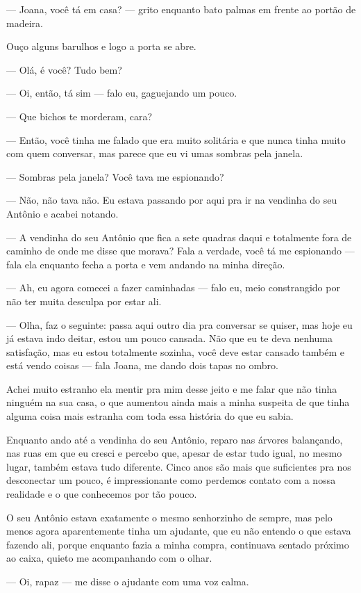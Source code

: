 — Joana, você tá em casa? — grito enquanto bato palmas em frente ao portão de madeira.

Ouço alguns barulhos e logo a porta se abre.

— Olá, é você? Tudo bem?

— Oi, então, tá sim — falo eu, gaguejando um pouco.

— Que bichos te morderam, cara?

— Então, você tinha me falado que era muito solitária e que nunca tinha muito com quem conversar, mas parece que eu vi umas sombras pela janela.

— Sombras pela janela? Você tava me espionando?

— Não, não tava não. Eu estava passando por aqui pra ir na vendinha do seu Antônio e acabei notando.

— A vendinha do seu Antônio que fica a sete quadras daqui e totalmente fora de caminho de onde me disse que morava? Fala a verdade, você tá me espionando — fala ela enquanto fecha a porta e vem andando na minha direção.

— Ah, eu agora comecei a fazer caminhadas — falo eu, meio constrangido por não ter muita desculpa por estar ali.

— Olha, faz o seguinte: passa aqui outro dia pra conversar se quiser, mas hoje eu já estava indo deitar, estou um pouco cansada. Não que eu te deva nenhuma satisfação, mas eu estou totalmente sozinha, você deve estar cansado também e está vendo coisas — fala Joana, me dando dois tapas no ombro.

Achei muito estranho ela mentir pra mim desse jeito e me falar que não tinha ninguém na sua casa, o que aumentou ainda mais a minha suspeita de que tinha alguma coisa mais estranha com toda essa história do que eu sabia.

Enquanto ando até a vendinha do seu Antônio, reparo nas árvores balançando, nas ruas em que eu cresci e percebo que, apesar de estar tudo igual, no mesmo lugar, também estava tudo diferente. Cinco anos são mais que suficientes pra nos desconectar um pouco, é impressionante como perdemos contato com a nossa realidade e o que conhecemos por tão pouco.

O seu Antônio estava exatamente o mesmo senhorzinho de sempre, mas pelo menos agora aparentemente tinha um ajudante, que eu não entendo o que estava fazendo ali, porque enquanto fazia a minha compra, continuava sentado próximo ao caixa, quieto me acompanhando com o olhar.

— Oi, rapaz — me disse o ajudante com uma voz calma.

